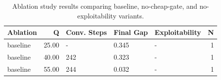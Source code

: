\begin{table}[htbp]
\centering
\caption{Ablation study results comparing baseline, no-cheap-gate, and no-exploitability variants.}
\label{tab:ablation_results}
\begin{tabular}{lrlllr}
\toprule
Ablation & Q & Conv. Steps & Final Gap & Exploitability & N \\
\midrule
baseline & 25.00 & - & 0.345 & - & 1 \\
baseline & 40.00 & 242 & 0.323 & - & 1 \\
baseline & 55.00 & 244 & 0.032 & - & 1 \\
\bottomrule
\end{tabular}

\end{table}
